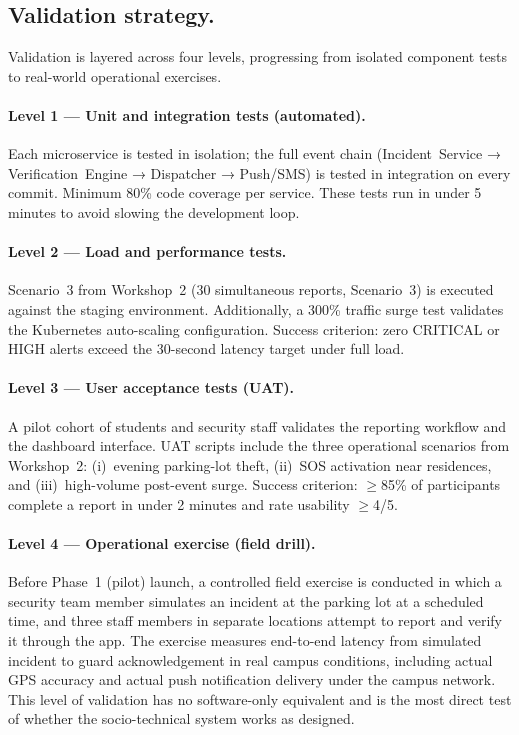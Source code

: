 \documentclass[12pt,a4paper]{article}
\begin{document}
\subsection{Validation strategy.}
Validation is layered across four levels, progressing from isolated
component tests to real-world operational exercises.

\paragraph{Level 1 --- Unit and integration tests (automated).}
Each microservice is tested in isolation; the full event chain
(Incident~Service → Verification~Engine → Dispatcher → Push/SMS)
is tested in integration on every commit. Minimum 80\% code
coverage per service. These tests run in under 5 minutes to avoid
slowing the development loop.

\paragraph{Level 2 --- Load and performance tests.}
Scenario~3 from Workshop~2 (30 simultaneous reports, Scenario~3)
is executed against the staging environment. Additionally, a
300\% traffic surge test validates the Kubernetes auto-scaling
configuration. Success criterion: zero CRITICAL or HIGH alerts
exceed the 30-second latency target under full load.

\paragraph{Level 3 --- User acceptance tests (UAT).}
A pilot cohort of students and security staff validates the
reporting workflow and the dashboard interface. UAT scripts
include the three operational scenarios from Workshop~2:
(i)~evening parking-lot theft, (ii)~SOS activation near
residences, and (iii)~high-volume post-event surge. Success
criterion: $\geq$85\% of participants complete a report in
under 2 minutes and rate usability $\geq$4/5.

\paragraph{Level 4 --- Operational exercise (field drill).}
Before Phase~1 (pilot) launch, a controlled field exercise is
conducted in which a security team member simulates an incident
at the parking lot at a scheduled time, and three staff members
in separate locations attempt to report and verify it through the
app. The exercise measures end-to-end latency from simulated
incident to guard acknowledgement in real campus conditions,
including actual GPS accuracy and actual push notification
delivery under the campus network. This level of validation
has no software-only equivalent and is the most direct test
of whether the socio-technical system works as designed.
\end{document}
